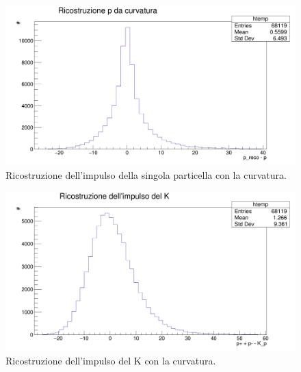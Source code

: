 \documentclass[8pt]{extarticle}
\begin{document}
\begin{figure}
	\begin{center}
		\includegraphics[scale=0.25]{reco_p_curvatura} 
		\caption{Ricostruzione dell'impulso della singola particella con la curvatura.}
		\label{fig:reco_p_curvatura}
	\end{center}
\end{figure}

\begin{figure}
	\begin{center}
		\includegraphics[scale=0.25]{reco_pk_curvatura} 
		\caption{Ricostruzione dell'impulso del K con la curvatura.}
		\label{fig:reco_pk_curvatura}
	\end{center}
\end{figure}
\end{document}
